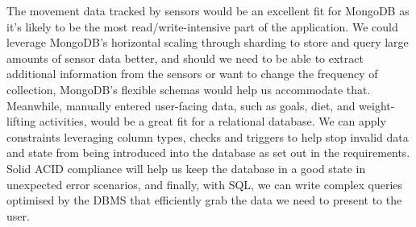 \documentclass{article}
\begin{document}
\newline
The movement data tracked by sensors would be an excellent fit for MongoDB as it's likely to be the most read/write-intensive part of the application. We could leverage MongoDB's horizontal scaling through sharding to store and query large amounts of sensor data better, and should we need to be able to extract additional information from the sensors or want to change the frequency of collection, MongoDB's flexible schemas would help us accommodate that. \\
\newline
Meanwhile, manually entered user-facing data, such as goals, diet, and weight-lifting activities, would be a great fit for a relational database. We can apply constraints leveraging column types, checks and triggers to help stop invalid data and state from being introduced into the database as set out in the requirements. Solid ACID compliance will help us keep the database in a good state in unexpected error scenarios, and finally, with SQL, we can write complex queries optimised by the DBMS that efficiently grab the data we need to present to the user.\\
\end{document}

